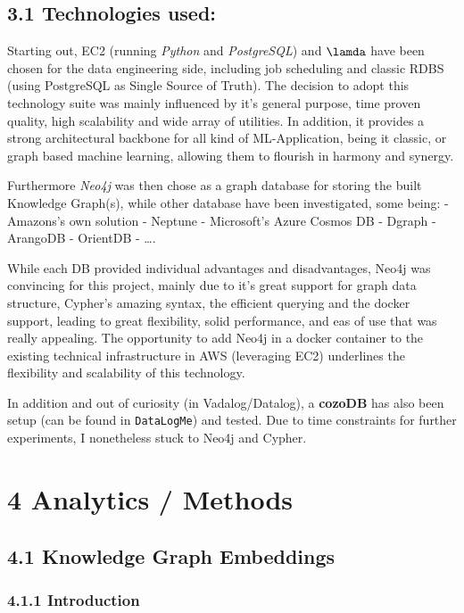 \documentclass[
]{article}
\begin{document}
\subsection{3.1 Technologies used:}\label{technologies-used}

Starting out, EC2 (running \emph{Python} and \emph{PostgreSQL}) and
\(\lamda\) have been chosen for the data engineering side, including job
scheduling and classic RDBS (using PostgreSQL as Single Source of
Truth). The decision to adopt this technology suite was mainly
influenced by it's general purpose, time proven quality, high
scalability and wide array of utilities. In addition, it provides a
strong architectural backbone for all kind of ML-Application, being it
classic, or graph based machine learning, allowing them to flourish in
harmony and synergy.

Furthermore \emph{Neo4j} was then chose as a graph database for storing
the built Knowledge Graph(s), while other database have been
investigated, some being: - Amazons's own solution - Neptune -
Microsoft's Azure Cosmos DB - Dgraph - ArangoDB - OrientDB - \ldots.

While each DB provided individual advantages and disadvantages, Neo4j
was convincing for this project, mainly due to it's great support for
graph data structure, Cypher's amazing syntax, the efficient querying
and the docker support, leading to great flexibility, solid performance,
and eas of use that was really appealing. The opportunity to add Neo4j
in a docker container to the existing technical infrastructure in AWS
(leveraging EC2) underlines the flexibility and scalability of this
technology.

In addition and out of curiosity (in Vadalog/Datalog), a \textbf{cozoDB}
has also been setup (can be found in \texttt{DataLogMe}) and tested. Due
to time constraints for further experiments, I nonetheless stuck to
Neo4j and Cypher.

\section{4 Analytics / Methods}\label{analytics-methods}

\subsection{4.1 Knowledge Graph
Embeddings}\label{knowledge-graph-embeddings}

\subsubsection{4.1.1 Introduction}\label{introduction-1}
\end{document}
